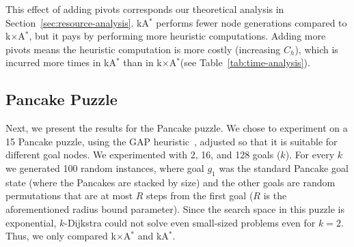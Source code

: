 \documentclass[smallextended]{svjour3}       %
\newcommand{\kD}{$k$-Dijkstra\xspace}
\newcommand{\kastar}{kA$^*$\xspace}
\newcommand{\kastarvar}[1]{\textup{kA}$^*_{#1}$\xspace}
\newcommand{\kastarmin}{\kastarvar{\min}}
\newcommand{\kxastar}{k$\times$A$^*$\xspace}
\newcommand{\roni}[1]{\textbf{[RS:#1]}}
\begin{document}
This effect of adding pivots corresponds our theoretical analysis in Section~\ref{sec:resource-analysis}. \kastar performs fewer node generations compared to \kxastar, but it pays by performing more heuristic computations. Adding more pivots means the heuristic computation is more costly (increasing $C_h$), which is incurred more times in \kastar than in \kxastar (see Table~\ref{tab:time-analysis}).





\subsection{Pancake Puzzle}

Next, we present the results for the Pancake puzzle. 
We chose to experiment on a 15 Pancake puzzle, using the GAP heuristic~\cite{helmert2010landmark}, adjusted so that it is suitable for different goal nodes. 
We experimented with 2, 16, and 128 goals ($k$).
For every $k$ we generated 100 random instances, where goal $g_1$ was the standard Pancake goal state (where the Pancakes are stacked by size) and the other goals are random permutations that are at most $R$ steps from the first goal ($R$ is the aforementioned radius bound parameter).  %
Since the search space in this puzzle is exponential, \kD could not solve even small-sized problems even for $k=2$. Thus, we only compared \kxastar and \kastar. 
\end{document}
